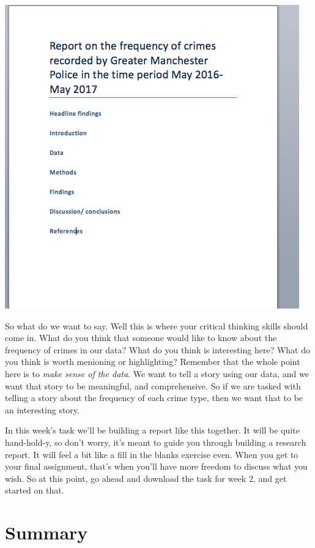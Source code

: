 \documentclass[]{book}
\theoremstyle{definition}
\theoremstyle{definition}
\theoremstyle{definition}
\theoremstyle{remark}
\begin{document}
\includegraphics{imgs/writeup_outline.png}

So what do we want to say. Well this is where your critical thinking
skills should come in. What do you think that someone would like to know
about the frequency of crimes in our data? What do you think is
interesting here? What do you think is worth menioning or highlighting?
Remember that the whole point here is to \emph{make sense of the data}.
We want to tell a story using our data, and we want that story to be
meaningful, and comprehensive. So if we are tasked with telling a story
about the frequency of each crime type, then we want that to be an
interesting story.

In this week's task we'll be building a report like this together. It
will be quite hand-hold-y, so don't worry, it's meant to guide you
through building a research report. It will feel a bit like a fill in
the blanks exercise even. When you get to your final assignment, that's
when you'll have more freedom to discuss what you wish. So at this
point, go ahead and download the task for week 2, and get started on
that.

\hypertarget{summary-1}{%
\section{Summary}\label{summary-1}}
\end{document}

